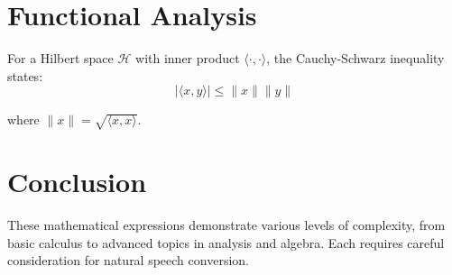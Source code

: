 \documentclass{article}
\begin{document}
\section{Functional Analysis}

For a Hilbert space $\mathcal{H}$ with inner product $\langle \cdot, \cdot \rangle$, the Cauchy-Schwarz inequality states:
\begin{equation}
|\langle x, y \rangle| \leq \|x\| \|y\|
\end{equation}

where $\|x\| = \sqrt{\langle x, x \rangle}$.

\section{Conclusion}

These mathematical expressions demonstrate various levels of complexity, from basic calculus to advanced topics in analysis and algebra. Each requires careful consideration for natural speech conversion.
\end{document}
